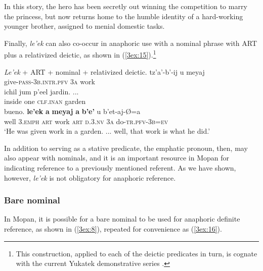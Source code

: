 \documentclass[output=paper]{langsci/langscibook}
\begin{document}
In this story, the hero has been secretly out winning the competition to marry the princess, but now returns home to the humble identity of a hard-working younger brother, assigned to menial domestic tasks.

Finally, {\emph{le'ek}} can also co-occur in anaphoric use with a nominal phrase with ART plus a relativized deictic, as shown in (\ref{3ex:15}).\footnote{This construction, applied to each of the deictic predicates in turn, is cognate with the current Yukatek demonstrative series \citep{hanks:90}.}


\begin{exe}
\ex\label{3ex:15}
{\emph{Le'ek}} + ART + nominal + relativized deictic.  
\exi{}
\gll	tz'a'-b'-ij	 				u 		meyaj	 \\
	give-{\textsc{pass-3b.intr.pfv}}		{\textsc{3a}}	work	\\
\glt
\exi{}
\gll	ichil 		jum	p'eel 		jardin. ... \\
	inside	one	{\textsc{clf.inan}}	garden \\
\glt
\exi{}
\gll	bueno. 	{\textbf{le'ek}} 	{\textbf{a}} 	{\textbf{meyaj}} 	{\textbf{a}}	{\textbf{b'e'}} 		u 		b'et-aj-\O=a  \\
	well		{\textsc{3.emph}}	{\textsc{art}}	work			{\textsc{art}}	{\textsc{d.3.nv}}	{\textsc{3a}}	do-{\textsc{tr.pfv-3b=ev}} \\
\glt	`He was given work in a garden. ... well, that work is what he did.'
\end{exe}

In addition to serving as a stative predicate, the emphatic pronoun, then, may also appear with nominals, and it is an important resource in Mopan for indicating reference to a previously mentioned referent. As we have shown, however, {\emph{le'ek}} is not obligatory for anaphoric reference.


\subsubsection{Bare nominal}\label{3sec:314}

In Mopan, it is possible for a bare nominal to be used for anaphoric definite reference, as shown in (\ref{3ex:8}), repeated for convenience as (\ref{3ex:16}).
\end{document}
